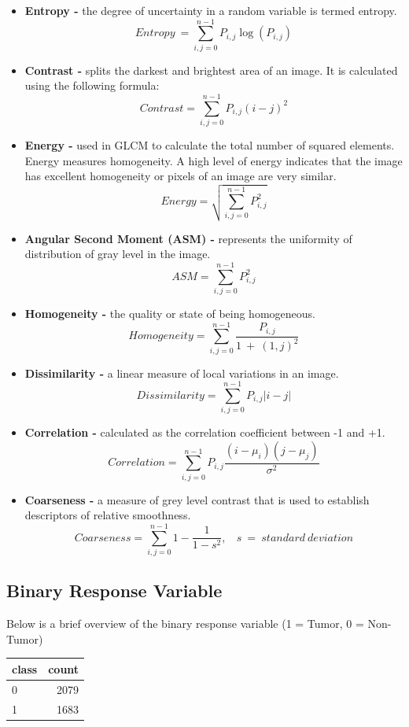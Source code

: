 \documentclass{article}
\begin{document}
\begin{itemize}


    \item \textbf{Entropy -} the degree of uncertainty in a random variable is termed entropy.
    \[
    Entropy\ = \sum\limits_{i,j=0}^{n-1} P_{i,j}\log(P_{i,j})
    \]
    \item \textbf{Contrast -} splits the darkest and brightest area of an image. It is calculated using the following formula:
    \[
    Contrast = \sum\limits_{i,j=0}^{n-1}P_{i,j}(i-j)^2
    \]
    \item \textbf{Energy -} used in GLCM to calculate the total number of squared elements. Energy measures homogeneity. A high level of energy indicates that the image has excellent homogeneity or pixels of an image are very similar.
    \[
    Energy = \sqrt{\sum\limits_{i,j=0}^{n-1}P_{i,j}^2}
    \]
    \item \textbf{Angular Second Moment (ASM) -} represents the uniformity of distribution of gray level in the image. 
    \[
    ASM = \sum\limits_{i,j=0}^{n-1}P_{i,j}^2
    \]
    \item \textbf{Homogeneity -} the quality or state of being homogeneous.
    \[
    Homogeneity = \sum\limits_{i,j=0}^{n-1}\frac{P_{i,j}}{1\ +\ (1, j)^2}
    \]
    \item \textbf{Dissimilarity -} a linear measure of local variations in an image.
    \[
    Dissimilarity = \sum\limits_{i,j=0}^{n-1}P_{i,j}|i-j|
    \]
    \item \textbf{Correlation -} calculated as the correlation coefficient between -1 and +1.
    \[
    Correlation = \sum\limits_{i,j=0}^{n-1}P_{i,j}\frac{(i-\mu_i)(j-\mu_j)}{\sigma^2}
    \]
    \item \textbf{Coarseness -} a measure of grey level contrast that is used to establish descriptors of relative smoothness.
    \[
    Coarseness = \sum\limits_{i,j=0}^{n-1}1- \frac{1}{1-s^2},\ \ \ \ s\ =\ standard\ deviation
    \]
\end{itemize}

\subsection{Binary Response Variable}
Below is a brief overview of the binary response variable (1 = Tumor, 0 = Non-Tumor)\\

\begin{tabular}{l|r}
\toprule
 class & count \\
\midrule
0 & 2079 \\
1 & 1683 \\
\bottomrule
\end{tabular}\\
\end{document}
